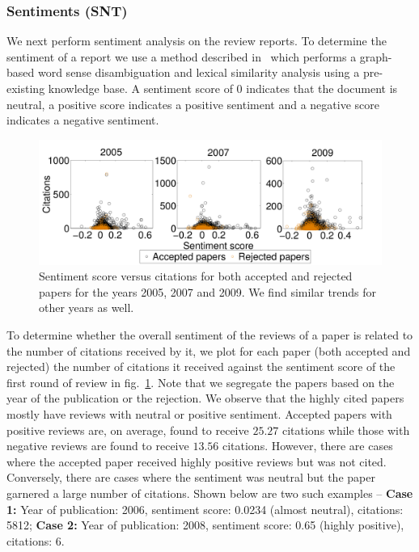 \subsubsection{Sentiments (SNT)}
We next perform sentiment analysis on the review reports. To determine the sentiment of a report we use a method described in~\cite{montejo2012random} which performs a graph-based word sense disambiguation and lexical similarity analysis using a pre-existing knowledge base. A sentiment score of 0 indicates that the document is neutral, a positive score  indicates a positive sentiment and a negative score indicates a negative sentiment. 


\begin{figure}[htpb]
\centering
\includegraphics[scale=0.23]{./texfiles/Chapter_4/jcdl/figures/year_sent_cit-eps-converted-to.pdf}
\caption{Sentiment score versus citations for both accepted and rejected papers for the years 2005, 2007 and 2009. We find similar trends for other years as well.}
\label{fig12}
\end{figure}

To determine whether the overall sentiment of the reviews of a paper is related to the number of citations received by it, we plot for each paper (both accepted and rejected) the number of citations it received against the  sentiment score of the first round of review in fig.~\ref{fig12}. Note that we segregate the papers based on the year of the publication or the rejection. We observe that the highly cited papers mostly have reviews with neutral or positive sentiment. Accepted papers with positive reviews are, on average, found to receive $25.27$ citations while those with negative reviews are found to receive $13.56$ citations.
However, there are cases where the accepted paper received highly positive reviews but was not cited. Conversely, there are cases where the sentiment was neutral but the paper garnered a large number of citations. Shown below are two such examples -- {\bf Case 1:} Year of publication: 2006, sentiment score: 0.0234 (almost neutral), citations: 5812; {\bf Case 2:} Year of publication: 2008, sentiment score: 0.65 (highly positive), citations: 6.


